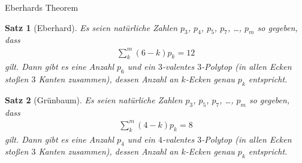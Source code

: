 \documentclass[10pt, notheorems]{beamer}
\newtheorem{theorem}{Satz}[section]
\begin{document}
\begin{frame}{{\sc Eberhard}s Theorem}
  \begin{theorem}[\sc Eberhard]
    Es seien natürliche Zahlen $p_3$, $p_4$, $p_5$, $p_7$, \dots, $p_m$ so gegeben, dass
    \begin{align*}
      \sum_k^m (6 - k) p_k = 12
    \end{align*}
    gilt. Dann gibt es eine Anzahl $p_6$ und ein $3$-valentes $3$-Polytop (in allen Ecken stoßen $3$ Kanten zusammen), dessen Anzahl an $k$-Ecken genau $p_k$ entspricht.   
  \end{theorem}
  \pause
  \begin{theorem}[\sc Grünbaum]
    Es seien natürliche Zahlen $p_3$, $p_5$, $p_7$, \dots, $p_m$ so gegeben, dass
    \begin{align*}
      \sum_k^m (4 - k) p_k = 8
    \end{align*}
    gilt. Dann gibt es eine Anzahl $p_4$ und ein $4$-valentes $3$-Polytop (in allen Ecken stoßen $3$ Kanten zusammen), dessen Anzahl an $k$-Ecken genau $p_k$ entspricht.   
  \end{theorem}
\end{frame}
\end{document}
